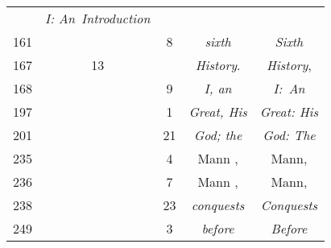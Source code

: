 \documentclass[a4paper,11pt]{article}
\begin{document}
\begin{center}
\begin{tabular}{|c|c|c|c|c|}
           & \textit{I: An~Introduction} \\
    161 & & \hphantom{0}8 & \textit{sixth} & \textit{Sixth} \\
    167 & 13 & & \textit{History}. & \textit{History}, \\
    168 & & \hphantom{0}9 & \textit{I, an} & \textit{I:~An} \\
    197 & & \hphantom{0}1 & \textit{Great, His} & \textit{Great: His} \\
    201 & & 21 & \textit{God; the} & \textit{God: The} \\
    235 & & \hphantom{0}4 & Mann , & Mann, \\
    236 & & \hphantom{0}7 & Mann , & Mann, \\
    238 & & 23 & \textit{conquests} & \textit{Conquests} \\
    249 & & \hphantom{0}3 & \textit{before} & \textit{Before} \\
    \hline
  \end{tabular}





  \newpage


\end{center}
\end{document}
